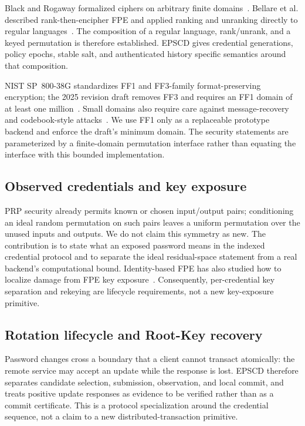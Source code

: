 \documentclass[preprint,12pt]{elsarticle}
\begin{document}
Black and Rogaway formalized ciphers on arbitrary finite
domains~\cite{black2002finite}. Bellare et al. described rank-then-encipher FPE
and applied ranking and unranking directly to regular
languages~\cite{bellare2009fpe}. The composition of a regular language,
rank/unrank, and a keyed permutation is therefore established. EPSCD gives
credential generations, policy epochs, stable salt, and authenticated history
specific semantics around that composition.

NIST SP~800-38G standardizes FF1 and FF3-family format-preserving encryption;
the 2025 revision draft removes FF3 and requires an FF1 domain of at least one
million~\cite{nist38g}. Small domains also require care against message-recovery
and codebook-style attacks~\cite{durak2017fpe,hoang2018curse}. We use FF1 only as a replaceable
prototype backend and enforce the draft's minimum domain. The security
statements are parameterized by a finite-domain permutation interface rather
than equating the interface with this bounded implementation.

\subsection{Observed credentials and key exposure}

PRP security already permits known or chosen input/output pairs; conditioning
an ideal random permutation on such pairs leaves a uniform permutation over
the unused inputs and outputs. We do not claim this symmetry as new. The
contribution is to state what an exposed password means in the indexed
credential protocol and to separate the ideal residual-space statement from a
real backend's computational bound. Identity-based FPE has also studied how to
localize damage from FPE key exposure~\cite{bellare2017ibfpe}. Consequently,
per-credential key separation and rekeying are lifecycle requirements, not a
new key-exposure primitive.

\subsection{Rotation lifecycle and Root-Key recovery}

Password changes cross a boundary that a client cannot transact atomically:
the remote service may accept an update while the response is lost. EPSCD
therefore separates candidate selection, submission, observation, and local
commit, and treats positive update responses as evidence to be verified rather
than as a commit certificate. This is a protocol specialization around the
credential sequence, not a claim to a new distributed-transaction primitive.
\end{document}
